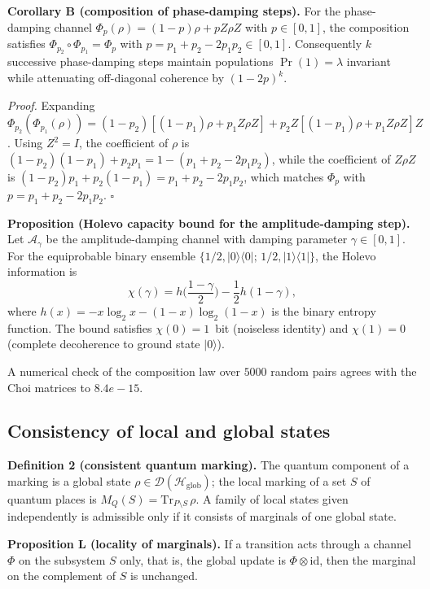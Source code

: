 \documentclass[final,3p,times]{elsarticle}
\begin{document}
\noindent\textbf{Corollary B (composition of phase-damping steps).} For the phase-damping channel $\Phi_p(\rho)=(1-p)\rho+pZ\rho Z$ with $p\in[0,1]$, the composition satisfies $\Phi_{p_2}\circ\Phi_{p_1}=\Phi_p$ with $p=p_1+p_2-2p_1p_2\in[0,1]$. Consequently $k$ successive phase-damping steps maintain populations $\Pr(1)=\lambda$ invariant while attenuating off-diagonal coherence by $(1-2p)^k$.

\noindent\textit{Proof.} Expanding $\Phi_{p_2}(\Phi_{p_1}(\rho)) = (1-p_2)[(1-p_1)\rho+p_1Z\rho Z] + p_2 Z[(1-p_1)\rho+p_1Z\rho Z]Z$. Using $Z^2=I$, the coefficient of $\rho$ is $(1-p_2)(1-p_1)+p_2p_1 = 1-(p_1+p_2-2p_1p_2)$, while the coefficient of $Z\rho Z$ is $(1-p_2)p_1+p_2(1-p_1) = p_1+p_2-2p_1p_2$, which matches $\Phi_p$ with $p=p_1+p_2-2p_1p_2$. $\square$

\noindent\textbf{Proposition (Holevo capacity bound for the amplitude-damping step).} Let $\mathcal A_\gamma$ be the amplitude-damping channel with damping parameter $\gamma\in[0,1]$. For the equiprobable binary ensemble $\{1/2, |0\rangle\langle0|;\, 1/2, |1\rangle\langle1|\}$, the Holevo information is
\begin{equation}
    \chi(\gamma) = h\Big(\frac{1-\gamma}{2}\Big) - \frac{1}{2}h(1-\gamma),
\end{equation}
where $h(x)=-x\log_2 x - (1-x)\log_2(1-x)$ is the binary entropy function. The bound satisfies $\chi(0)=1$~bit (noiseless identity) and $\chi(1)=0$ (complete decoherence to ground state $|0\rangle$).

A numerical check of the composition law over $5000$ random pairs agrees with the Choi matrices to $8.4e-15$.

\subsection{Consistency of local and global states}\label{sec:consistency}
\noindent\textbf{Definition 2 (consistent quantum marking).} The quantum component of a marking is a global state $\rho\in\mathcal D(\mathcal H_{\mathrm{glob}})$; the local marking of a set $S$ of quantum places is $M_Q(S)=\mathrm{Tr}_{P\setminus S}\,\rho$. A family of local states given independently is admissible only if it consists of marginals of one global state.

\noindent\textbf{Proposition L (locality of marginals).} If a transition acts through a channel $\Phi$ on the subsystem $S$ only, that is, the global update is $\Phi\otimes\mathrm{id}$, then the marginal on the complement of $S$ is unchanged.
\end{document}
